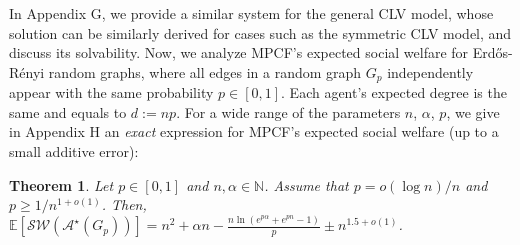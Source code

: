 \documentclass[letterpaper]{article} %
\newtheorem{theorem}{Theorem}
\begin{document}
In Appendix G, we provide a similar system for the general CLV model, whose solution can be similarly derived for cases such as the symmetric CLV model, and discuss its solvability. Now, we analyze MPCF's expected social welfare for Erd\H{o}s-R\'{e}nyi random graphs, where all edges in a random graph $G_p$ independently appear with the same probability $p \in [0,1]$. Each agent's expected degree is the same and equals to $d := np$. For a wide range of the parameters $n$, $\alpha$, $p$, we give in Appendix H an \textit{exact} expression for MPCF's expected social welfare (up to a small additive error):
\begin{theorem}
    \label{thm:expected sw for erdos}
    Let ${p} \in [0,1]$ and $n, \alpha \in \mathbb{N}$. Assume that $p = o(\log n)/n$ and $p \geq 1/ n^{1+o(1)}$. Then, %
    $\mathbb{E}[\mathcal{SW}(\mathcal{A}^\star(G_{{p}}))] = n^2 + \alpha n - \frac{n \ln (e^{p\alpha} + e^{pn} - 1 ) }{p} \pm n^{1.5 + o(1)}$.
\end{theorem}


\end{document}

